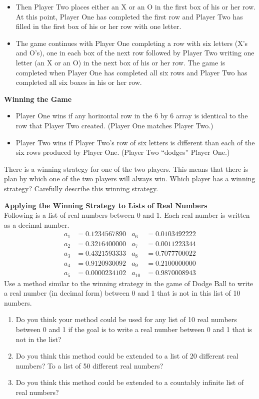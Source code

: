 \begin{previewactivity}
\begin{itemize}
\item Then Player Two places either an X or an O in the first box of his or her row.  At this point, Player One has completed the first row and Player Two has filled in the first box of his or her row with one letter.

\item The game continues with Player One completing a row with six letters (X's and O's), one in each box of the next row followed by Player Two writing one letter (an X or an O) in the next box of his or her row.  The game is completed when Player One has completed all six rows and Player Two has completed all six boxes in his or her row.
\end{itemize}

\newpar
\textbf{Winning the Game}
\begin{itemize}
\item Player One wins if any horizontal row in the 6 by 6 array is identical to the row that Player Two created.  (Player One matches Player Two.)

\item Player Two wins if Player Two's row of six letters is different than each of the six rows produced by Player One.  (Player Two ``dodges'' Player One.)
\end{itemize}
There is a winning strategy for one of the two players.  This means that there is plan by which one of the two players will always win.  Which player has a winning strategy?  Carefully describe this winning strategy.


\newpar
\textbf{Applying the Winning Strategy to Lists of Real Numbers} \\
Following is a list of real numbers between 0 and 1.  Each real number is written as a decimal number.
\begin{align*}
a_1 &= 0.1234567890   &  a_6 &= 0.0103492222 \\
a_2 &= 0.3216400000   &  a_7 &= 0.0011223344 \\
a_3 &= 0.4321593333   &  a_8 &= 0.7077700022 \\
a_4 &= 0.9120930092   &  a_9 &= 0.2100000000 \\
a_5 &= 0.0000234102   & a_{10} &= 0.9870008943 
\end{align*}
Use a method similar to the winning strategy in the game of Dodge Ball to write a real number (in decimal form) between 0 and 1 that is not in this list of 10 numbers.

\begin{enumerate}
  \item Do you think your method could be used for any list of 10 real numbers between 0 and 1 if the goal is to write a real number between 0 and 1 that is not in the list?
  \item Do you think this method could be extended to a list of 20 different real numbers?  To a list of 50 different real numbers?
  \item Do you think this method could be extended to a countably infinite list of real numbers?
\end{enumerate}

\end{previewactivity}
\hbreak

\endinput
